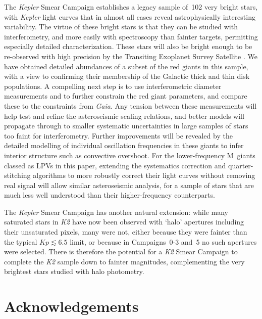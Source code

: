 \documentclass[modern]{aastex62}
\newcommand{\kepler}{\textit{Kepler}\xspace}
\newcommand{\ktwo}{\textit{K2}\xspace}
\newcommand{\gaia}{\textit{Gaia}\xspace}
\begin{document}
The \kepler Smear Campaign establishes a legacy sample of~102 very bright stars, with \kepler light curves that in almost all cases reveal astrophysically interesting variability. The virtue of these bright stars is that they can be studied with interferometry, and more easily with spectroscopy than fainter targets, permitting especially detailed characterization. These stars will also be bright enough to be re-observed with high precision by the Transiting Exoplanet Survey Satellite \citep[TESS;][]{tess}. We have obtained detailed abundances of a subset of the red giants in this sample, with a view to confirming their membership of the Galactic thick and thin disk populations. A compelling next step is to use interferometric diameter measurements and to further constrain the red giant parameters, and compare these to the constraints from \gaia. Any tension between these measurements will help test and refine the asteroseismic scaling relations, and better models will propagate through to smaller systematic uncertainties in large samples of stars too faint for interferometry. Further improvements will be revealed by the detailed modelling of individual oscillation frequencies in these giants to infer interior structure such as convective overshoot. For the lower-frequency M~giants classed as LPVs in this paper, extending the systematics correction and quarter-stitching algorithms to more robustly correct their light curves without removing real signal will allow similar asteroseismic analysis, for a sample of stars that are much less well understood than their higher-frequency counterparts. 

The \kepler Smear Campaign has another natural extension: while many saturated stars in \ktwo have now been observed with `halo' apertures including their unsaturated pixels, many were not, either because they were fainter than the typical $Kp \lesssim 6.5$ limit, or because in Campaigns~0-3 and~5 no such apertures were selected. There is therefore the potential for a \ktwo Smear Campaign to complete the \ktwo sample down to fainter magnitudes, complementing the very brightest stars studied with halo photometry. 


\section*{Acknowledgements} %
\end{document}
